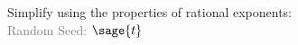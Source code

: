 \documentclass{article}%
\begin{document}

\noindent Simplify using the properties of rational exponents: \\
\textcolor{gray}{Random Seed: $\sage{t}$}


\begin{enumerate}
\begin{multicols}{3}
\end{multicols}
\end{enumerate}


\newpage


\begin{multicols}{3}
\begin{enumerate}
\end{enumerate}
\end{multicols}
\end{document}
